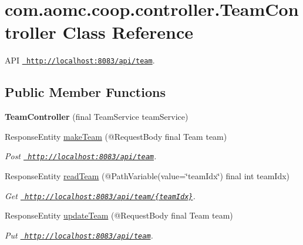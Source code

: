 \hypertarget{classcom_1_1aomc_1_1coop_1_1controller_1_1_team_controller}{}\section{com.\+aomc.\+coop.\+controller.\+Team\+Controller Class Reference}
\label{classcom_1_1aomc_1_1coop_1_1controller_1_1_team_controller}


A\+PI \href{http://localhost:8083/api/team}{\texttt{ http\+://localhost\+:8083/api/team}}.  


\subsection*{Public Member Functions}
\begin{DoxyCompactItemize}
\item 
\mbox{\label{classcom_1_1aomc_1_1coop_1_1controller_1_1_team_controller_a128b7d4b135cf66f6615c584ca55a40a}} 
{\bfseries Team\+Controller} (final Team\+Service team\+Service)
\item 
Response\+Entity \mbox{\hyperlink{classcom_1_1aomc_1_1coop_1_1controller_1_1_team_controller_a5ffe7bc4c7dd609d828848bae014440f}{make\+Team}} (@Request\+Body final Team team)
\begin{DoxyCompactList}\small\item\em Post \href{http://localhost:8083/api/team}{\texttt{ http\+://localhost\+:8083/api/team}}. \end{DoxyCompactList}\item 
Response\+Entity \mbox{\hyperlink{classcom_1_1aomc_1_1coop_1_1controller_1_1_team_controller_ae58612664e52e32d503efa3008565826}{read\+Team}} (@Path\+Variable(value=\char`\"{}team\+Idx\char`\"{}) final int team\+Idx)
\begin{DoxyCompactList}\small\item\em Get \href{http://localhost:8083/api/team/{teamIdx}}{\texttt{ http\+://localhost\+:8083/api/team/\{team\+Idx\}}}. \end{DoxyCompactList}\item 
Response\+Entity \mbox{\hyperlink{classcom_1_1aomc_1_1coop_1_1controller_1_1_team_controller_ad03a0ca2d1d0680848a5efef33934941}{update\+Team}} (@Request\+Body final Team team)
\begin{DoxyCompactList}\small\item\em Put \href{http://localhost:8083/api/team}{\texttt{ http\+://localhost\+:8083/api/team}}. \end{DoxyCompactList}\item 

\end{DoxyCompactItemize}
